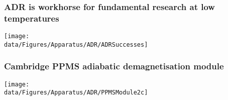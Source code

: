 \begin{frame}[plain,label=Workhorse]
\frametitle{ADR is workhorse for fundamental research at low temperatures}

\texttt{[image: \\data/Figures/Apparatus/ADR/ADRSuccesses]}

\end{frame}


\begin{frame}
\frametitle{Cambridge PPMS adiabatic demagnetisation module}

\texttt{[image: \\data/Figures/Apparatus/ADR/PPMSModule2c]}

\end{frame}




